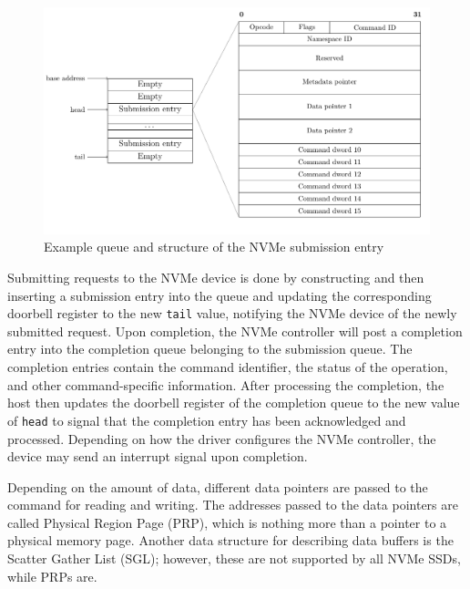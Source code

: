 \begin{figure}[]
  \centering
    \includegraphics[width=\textwidth]{figures/nvme-queue}
    \caption{Example queue and structure of the NVMe submission entry}
    \label{fig:nvme-queue}
\end{figure}

Submitting requests to the NVMe device is done by constructing and then inserting a submission entry into the queue and updating the corresponding doorbell register to the new \texttt{tail} value, notifying the NVMe device of the newly submitted request. Upon completion, the NVMe controller will post a completion entry into the completion queue belonging to the submission queue. The completion entries contain the command identifier, the status of the operation, and other command-specific information. After processing the completion, the host then updates the doorbell register of the completion queue to the new value of \texttt{head} to signal that the completion entry has been acknowledged and processed. Depending on how the driver configures the NVMe controller, the device may send an interrupt signal upon completion.

Depending on the amount of data, different data pointers are passed to the command for reading and writing. The addresses passed to the data pointers are called Physical Region Page (PRP), which is nothing more than a pointer to a physical memory page. Another data structure for describing data buffers is the Scatter Gather List (SGL); however, these are not supported by all NVMe SSDs, while PRPs are.

